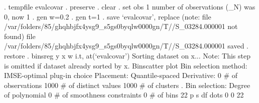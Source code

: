 . tempfile evalcovar
{\smallskip}
. preserve
{\smallskip}
. clear
{\smallskip}
. set obs 1
number of observations (_N) was 0, now 1
{\smallskip}
. gen w=0.2
{\smallskip}
. gen t=1
{\smallskip}
. save `evalcovar', replace
(note: file /var/folders/85/ghqhbjfx4ysg9_s5gs0byqlw0000gn/T//S_03284.000001 not found)
file /var/folders/85/ghqhbjfx4ysg9_s5gs0byqlw0000gn/T//S_03284.000001 saved
{\smallskip}
. restore
{\smallskip}
. binsreg y x w i.t, at(`evalcovar')
Sorting dataset on x...
Note: This step is omitted if dataset already sorted by x.
{\smallskip}
Binscatter plot
Bin selection method: IMSE-optimal plug-in choice
Placement: Quantile-spaced
Derivative: 0
{\smallskip}
\# of observations             {\VBAR}    1000
\# of distinct values          {\VBAR}    1000
\# of clusters                 {\VBAR}       .
Bin selection:                {\VBAR} 
         Degree of polynomial {\VBAR}       0
  \# of smoothness constraints {\VBAR}       0
                    \# of bins {\VBAR}      22
{\smallskip}
         {\VBAR}      p       s       df
 dots    {\VBAR}      0       0       22
